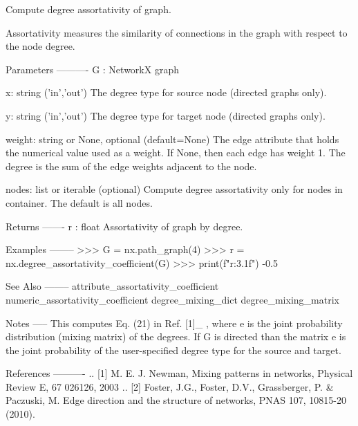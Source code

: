 \begin{DoxyVerb}Compute degree assortativity of graph.

Assortativity measures the similarity of connections
in the graph with respect to the node degree.

Parameters
----------
G : NetworkX graph

x: string ('in','out')
   The degree type for source node (directed graphs only).

y: string ('in','out')
   The degree type for target node (directed graphs only).

weight: string or None, optional (default=None)
   The edge attribute that holds the numerical value used
   as a weight.  If None, then each edge has weight 1.
   The degree is the sum of the edge weights adjacent to the node.

nodes: list or iterable (optional)
    Compute degree assortativity only for nodes in container.
    The default is all nodes.

Returns
-------
r : float
   Assortativity of graph by degree.

Examples
--------
>>> G = nx.path_graph(4)
>>> r = nx.degree_assortativity_coefficient(G)
>>> print(f"{r:3.1f}")
-0.5

See Also
--------
attribute_assortativity_coefficient
numeric_assortativity_coefficient
degree_mixing_dict
degree_mixing_matrix

Notes
-----
This computes Eq. (21) in Ref. [1]_ , where e is the joint
probability distribution (mixing matrix) of the degrees.  If G is
directed than the matrix e is the joint probability of the
user-specified degree type for the source and target.

References
----------
.. [1] M. E. J. Newman, Mixing patterns in networks,
   Physical Review E, 67 026126, 2003
.. [2] Foster, J.G., Foster, D.V., Grassberger, P. & Paczuski, M.
   Edge direction and the structure of networks, PNAS 107, 10815-20 (2010).
\end{DoxyVerb}
 \mbox{\label{namespacenetworkx_1_1algorithms_1_1assortativity_1_1correlation_abdb15d01a465144e1ad48b7d7ac218b3}} 
